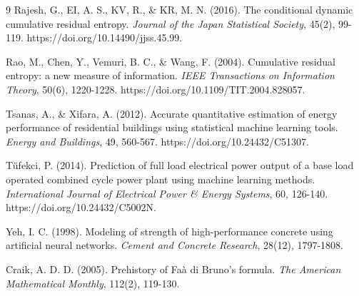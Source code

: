 \documentclass[twoside]{article}
\begin{document}
\begin{thebibliography}{9}
Rajesh, G., EI, A. S., KV, R., \& KR, M. N. (2016).
The conditional dynamic cumulative residual entropy.
\emph{Journal of the Japan Statistical Society}, 45(2), 99-119.
https://doi.org/10.14490/jjss.45.99.

Rao, M., Chen, Y., Vemuri, B. C., \& Wang, F. (2004).
Cumulative residual entropy: a new measure of information.
\emph{IEEE Transactions on Information Theory}, 50(6), 1220-1228.
https://doi.org/10.1109/TIT.2004.828057.

Tsanas, A., \& Xifara, A. (2012).
Accurate quantitative estimation of energy performance of residential buildings using statistical machine learning tools.
\emph{Energy and Buildings}, 49, 560-567.
https://doi.org/10.24432/C51307.

Tüfekci, P. (2014).
Prediction of full load electrical power output of a base load operated combined cycle power plant using machine learning methods.
\emph{International Journal of Electrical Power \& Energy Systems}, 60, 126-140.
https://doi.org/10.24432/C5002N.

Yeh, I. C. (1998).
Modeling of strength of high-performance concrete using artificial neural networks.
\emph{Cement and Concrete Research}, 28(12), 1797-1808.

Craik, A. D. D. (2005).
Prehistory of Fa\`a di Bruno's formula.
\emph{The American Mathematical Monthly}, 112(2), 119-130.

\end{thebibliography}
 
\end{document}
